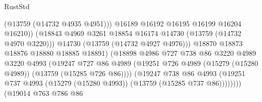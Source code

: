 \begin{lexlean}{RustStd}
\begin{coremodule}
                                              (@13759 (@14732 @4935 @4951)))
                                            @16189
                                            @16192
                                            @16195
                                            @16199
                                            @16204
                                            @16210))
                                        (@18843
                                          @4969
                                          @3261
                                          @18854
                                          @16174
                                          @14730
                                          (@13759 (@14732 @4970 @3220)))
                                        @14730
                                        (@13759 (@14732 @4927 @4976)))
                                      @18870
                                      @18873
                                      @18876
                                      @18880
                                      @18885
                                      @18891)
                                    (@18898
                                      @4986
                                      @727
                                      @738
                                      @86
                                      @3220
                                      @4989
                                      @3220
                                      @4993
                                      (@19247
                                        @727
                                        @86
                                        @4989
                                        (@19251
                                          @726
                                          @4989
                                          (@15279 (@15280 @4989))
                                          (@13759 (@15285 @726 @86))))
                                      (@19247
                                        @738
                                        @86
                                        @4993
                                        (@19251
                                          @737
                                          @4993
                                          (@15279 (@15280 @4993))
                                          (@13759 (@15285 @737 @86))))))))
                              (@19014
                                @763
                                @786
                                @86

\end{coremodule}
\end{lexlean}
